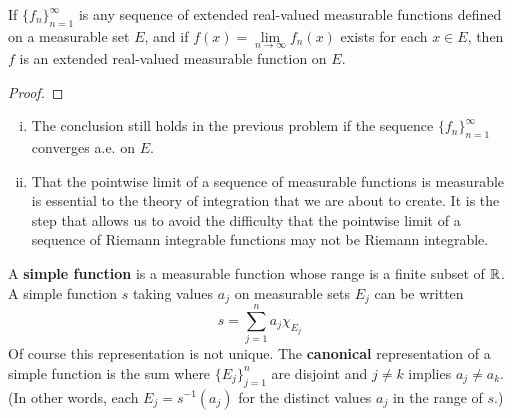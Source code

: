 \begin{pblm}\label{p:ext_real_val_seq}%
	If $\{f_n\}_{n=1}^\infty$ is any sequence of extended real-valued 
	measurable functions defined on a measurable set $E$, and if $f(x) = 
	\lim\limits_{n\to\infty}f_n(x)$ exists for each $x \in E$, then $f$ is an 
	extended real-valued measurable function on $E$. 
\begin{proof}
\end{proof}
\end{pblm}

\begin{rmk}%
	\begin{enumerate}[(i)]
	\item The conclusion still holds in the previous problem if the sequence 
	$\{f_n\}_{n=1}^\infty$ converges a.e. on $E$. 
	\item That the pointwise limit of a sequence of measurable functions is 
	measurable is essential to the theory of integration that we are about to 
	create. It is the step that allows us to avoid the difficulty that the 
	pointwise limit of a sequence of Riemann integrable functions may not be 
	Riemann integrable. 
	\end{enumerate}
\end{rmk}

\begin{defn}\label{d:simplefunction}%
	A \textbf{simple function} is a measurable function whose range is a finite 
	subset of $\mathbb{R}$. A simple function $s$ taking values $a_j$ on measurable 
	sets $E_j$ can be written 
	\begin{equation*}
		s = \sum\limits_{j=1}^n a_j \chi_{E_j}
	\end{equation*}
	Of course this representation is not unique. The \textbf{canonical} 
	representation of a simple function is the sum where $\{E_j\}_{j=1}^n$ 
	are disjoint and $j \neq k$ implies $a_j \neq a_k$. (In other words, each 
	$E_j = s^{-1} (a_j)$ for the distinct values $a_j$ in the range of $s$.)
\end{defn}


